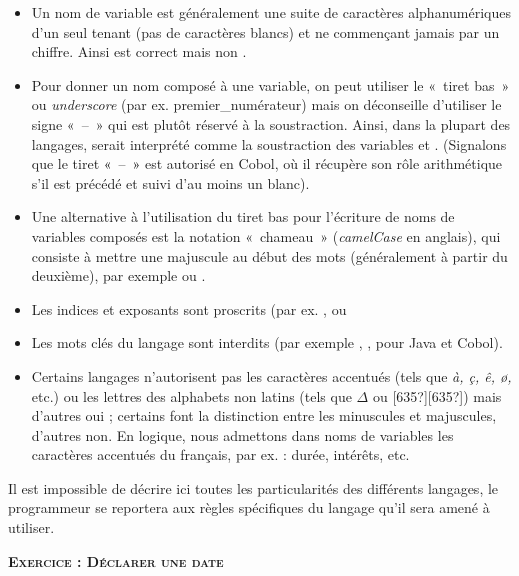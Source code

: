 \liststyleListv
\begin{itemize}
\item {
Un nom de variable est généralement une suite de caractères
alphanumériques d’un seul tenant (pas de caractères blancs) et ne
commençant jamais par un chiffre. Ainsi  est
correct mais non . }
\item {
Pour donner un nom composé à une variable, on peut utiliser le «~tiret
bas~» ou \textit{underscore} (par ex. premier\_numérateur) mais on
déconseille d’utiliser le signe «~–~» qui est plutôt réservé à la
soustraction. Ainsi, dans la plupart des langages,
 serait interprété comme la
soustraction des variables  et
. (Signalons que le tiret 
\textcolor{black}{«~–~»} est autorisé en Cobol, où il récupère son rôle
arithmétique s’il est précédé et suivi d’au moins un blanc). }
\item {
Une alternative à l’utilisation du tiret bas pour l’écriture de noms de
variables composés est la notation «~chameau~» (\textit{camelCase} en
anglais), qui consiste à mettre une majuscule au début des mots
(généralement à partir du deuxième), par exemple
 ou
.}
\item {
Les indices et exposants sont proscrits (par ex.
,
 ou
 }
\item {
Les mots clés du langage sont interdits (par exemple
, , pour
Java et Cobol).}
\item {
Certains langages n’autorisent pas les caractères accentués (tels que
\textit{à, ç, ê, ø,} etc.) ou les lettres des alphabets non latins
(tels que ${\Delta}$ ou
\textsf{[635?][635?]}) mais d’autres oui ; certains font la distinction
entre les minuscules et majuscules, d’autres non. En logique, nous
admettons dans noms de variables les caractères accentués du français,
par ex. : durée, intérêts, etc. }
\end{itemize}
{
Il est impossible de décrire ici toutes les particularités des
différents langages, le programmeur se reportera aux règles spécifiques
du langage qu’il sera amené à utiliser.}

{\sffamily\bfseries\scshape
Exercice : Déclarer une date}

